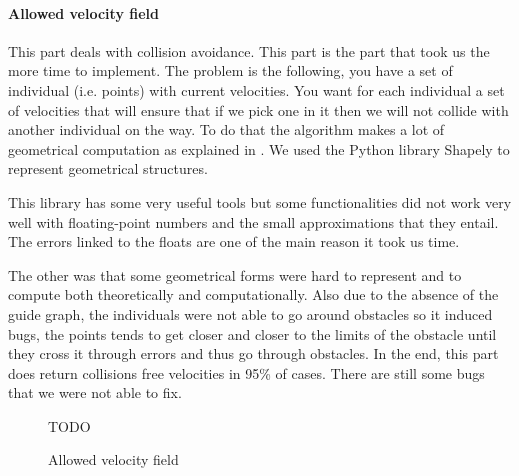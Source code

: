 \paragraph{Allowed velocity field}

This part deals with collision avoidance. This part is the part that
took us the more time to implement. The problem is the following, you
have a set of individual (i.e. points) with current velocities. You
want for each individual a set of velocities that will ensure that if
we pick one in it then we will not collide with another individual on
the way. To do that the algorithm makes a lot of geometrical
computation as explained in \cite{vandenBerg2011}. We used the Python
library Shapely to represent geometrical structures.

This library has some very useful tools but some functionalities did
not work very well with floating-point numbers and the small
approximations that they entail. The errors linked to the floats are
one of the main reason it took us time. 


The other was that some geometrical forms were hard to represent and
to compute both theoretically and computationally.  Also due to the
absence of the guide graph, the individuals were not able to go around
obstacles so it induced bugs, the points tends to get closer and
closer to the limits of the obstacle until they cross it through
errors and thus go through obstacles.  In the end, this part does
return collisions free velocities in 95\% of cases. There are still
some bugs that we were not able to fix.  %


\begin{figure}[h!]
  \centering
  \begin{subfigure}[t]{0.45\textwidth}
    \scalebox{.4}{}
  \end{subfigure} %
  \begin{subfigure}[t]{0.45\textwidth}
  \scalebox{.4}{}
  \end{subfigure}
  \caption{TODO}
\end{figure}

\begin{figure}[h!]
  \centering
  \scalebox{.475}{}
  \caption{Allowed velocity field}
\end{figure}



